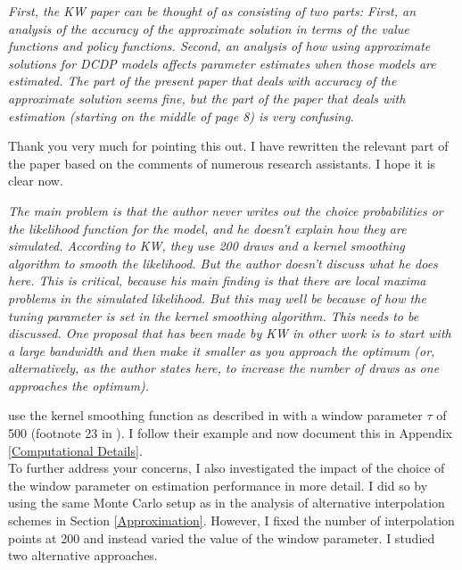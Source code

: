 \begin{boenumerate}
\item \textit{First, the KW paper can be thought of as consisting of two parts: First, an analysis of the accuracy of the approximate solution in terms of the value functions and policy functions. Second, an analysis of how using approximate solutions for DCDP models affects parameter estimates when those models are estimated. The part of the present paper that deals with accuracy of the approximate solution seems fine, but the part of the paper that deals with estimation (starting on the middle of page 8) is very confusing.}\vspace{0.5cm}

Thank you very much for pointing this out. I have rewritten the relevant part of the paper based on the comments of numerous research assistants. I hope it is clear now.
\item \textit{The main problem is that the author never writes out the choice probabilities or the likelihood function for the model, and he doesn't explain how they are simulated. According to KW, they use 200 draws and a kernel smoothing algorithm to smooth the likelihood. But the author doesn't discuss what he does here. This is critical, because his main finding is that there are local maxima problems in the simulated likelihood. But this may well be because of how the tuning parameter is set in the kernel smoothing algorithm. This needs to be discussed. One proposal that has been made by KW in other work is to start with a large bandwidth and then make it smaller as you approach the optimum (or, alternatively, as the author states here, to increase the number of draws as one approaches the optimum).}\vspace{0.5cm}

\cite{Keane.1994} use the kernel smoothing function as described in \citet{McFadden.1989} with a window parameter $\tau$ of 500 (footnote 23 in \cite{Keane.1994}). I follow their example and now document this in Appendix \ref{Computational Details}.\\\newline
%
To further address your concerns, I also investigated the impact of the choice of the window parameter on estimation performance in more detail. I did so by using the same Monte Carlo setup as in the analysis of alternative interpolation schemes in Section \ref{Approximation}. However, I fixed the number of interpolation points at 200 and instead varied the value of the window parameter. I studied two alternative approaches.


\end{boenumerate}
